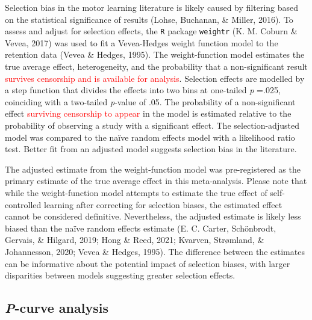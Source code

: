 \documentclass[
  english,
  man,floatsintext]{apa7}
\begin{document}
Selection bias in the motor learning literature is likely caused by filtering based on the statistical significance of results (Lohse, Buchanan, \& Miller, 2016). To assess and adjust for selection effects, the \texttt{R} package \texttt{weightr} (K. M. Coburn \& Vevea, 2017) was used to fit a Vevea-Hedges weight function model to the retention data (Vevea \& Hedges, 1995). The weight-function model estimates the true average effect, heterogeneity, and the probability that a non-significant result \textcolor{red}{survives censorship and is available for analysis}. Selection effects are modelled by a step function that divides the effects into two bins at one-tailed \emph{p} =.025, coinciding with a two-tailed \emph{p}-value of .05. The probability of a non-significant effect \textcolor{red}{surviving censorship to appear} in the model is estimated relative to the probability of observing a study with a significant effect. The selection-adjusted model was compared to the naïve random effects model with a likelihood ratio test. Better fit from an adjusted model suggests selection bias in the literature.

The adjusted estimate from the weight-function model was pre-registered as the primary estimate of the true average effect in this meta-analysis. Please note that while the weight-function model attempts to estimate the true effect of self-controlled learning after correcting for selection biases, the estimated effect cannot be considered definitive. Nevertheless, the adjusted estimate is likely less biased than the naïve random effects estimate (E. C. Carter, Schönbrodt, Gervais, \& Hilgard, 2019; Hong \& Reed, 2021; Kvarven, Strømland, \& Johannesson, 2020; Vevea \& Hedges, 1995). The difference between the estimates can be informative about the potential impact of selection biases, with larger disparities between models suggesting greater selection effects.

\hypertarget{p-curve-analysis}{%
\subsection{\texorpdfstring{\emph{P}-curve analysis}{P-curve analysis}}\label{p-curve-analysis}}
\end{document}
